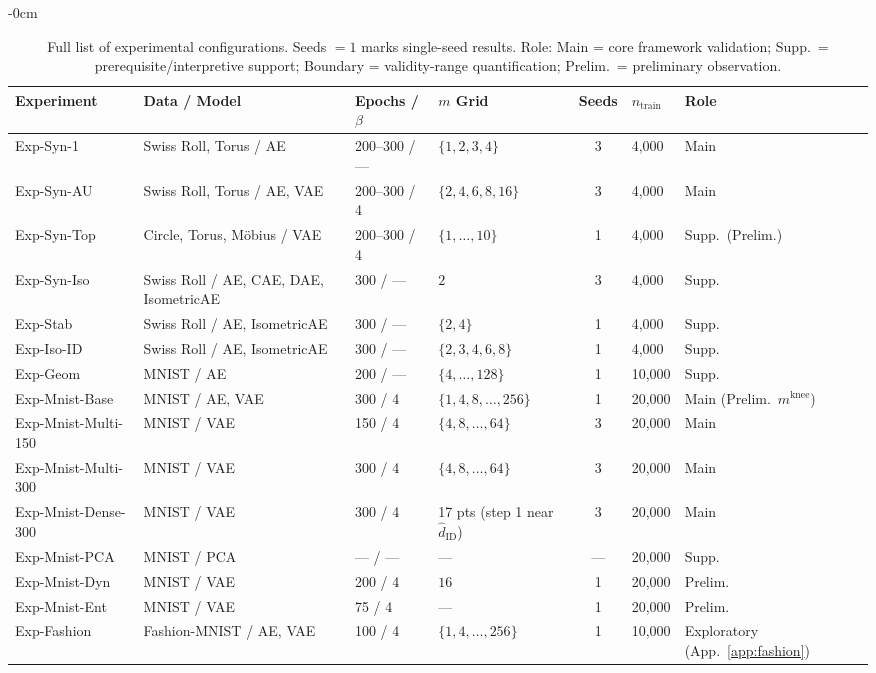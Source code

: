 \documentclass[make,article,submit,pdftex,moreauthors]{Definitions/mdpi}
\newcommand{\mknee}{m^{\mathrm{knee}}}
\begin{document}
\begin{table}[H]
\begin{adjustwidth}{-\extralength}{0cm}
\centering
\caption{Full list of experimental configurations. Seeds $=1$ marks single-seed results. Role: Main = core framework validation; Supp.\ = prerequisite/interpretive support; Boundary = validity-range quantification; Prelim.\ = preliminary observation.}
\label{tab:exp_full}
\footnotesize
\begin{tabular}{p{3.2cm}p{3.3cm}p{2.4cm}p{3.0cm}cp{1.2cm}p{1.8cm}}
\toprule
Experiment & Data / Model & Epochs / $\beta$ & $m$ Grid & Seeds & $n_\mathrm{train}$ & Role \\
\midrule
Exp-Syn-1 & Swiss Roll, Torus / AE & 200--300 / --- & $\{1,2,3,4\}$ & 3 & 4,000 & Main \\
Exp-Syn-AU & Swiss Roll, Torus / AE, VAE & 200--300 / 4 & $\{2,4,6,8,16\}$ & 3 & 4,000 & Main \\
Exp-Syn-Top & Circle, Torus, M\"obius / VAE & 200--300 / 4 & $\{1,\ldots,10\}$ & 1 & 4,000 & Supp.\ (Prelim.) \\
Exp-Syn-Iso & Swiss Roll / AE, CAE, DAE, IsometricAE & 300 / --- & $2$ & 3 & 4,000 & Supp. \\
Exp-Stab & Swiss Roll / AE, IsometricAE & 300 / --- & $\{2,4\}$ & 1 & 4,000 & Supp. \\
Exp-Iso-ID & Swiss Roll / AE, IsometricAE & 300 / --- & $\{2,3,4,6,8\}$ & 1 & 4,000 & Supp. \\
Exp-Geom & MNIST / AE & 200 / --- & $\{4,\ldots,128\}$ & 1 & 10,000 & Supp. \\
Exp-Mnist-Base & MNIST / AE, VAE & 300 / 4 & $\{1,4,8,\ldots,256\}$ & 1 & 20,000 & Main (Prelim.\ $\mknee$) \\
Exp-Mnist-Multi-150 & MNIST / VAE & 150 / 4 & $\{4,8,\ldots,64\}$ & 3 & 20,000 & Main \\
Exp-Mnist-Multi-300 & MNIST / VAE & 300 / 4 & $\{4,8,\ldots,64\}$ & 3 & 20,000 & Main \\
Exp-Mnist-Dense-300 & MNIST / VAE & 300 / 4 & 17 pts (step 1 near $\hat{d}_\mathrm{ID}$) & 3 & 20,000 & Main \\
Exp-Mnist-PCA & MNIST / PCA & --- / --- & --- & --- & 20,000 & Supp. \\
Exp-Mnist-Dyn & MNIST / VAE & 200 / 4 & $16$ & 1 & 20,000 & Prelim. \\
Exp-Mnist-Ent & MNIST / VAE & 75 / 4 & --- & 1 & 20,000 & Prelim. \\
Exp-Fashion & Fashion-MNIST / AE, VAE & 100 / 4 & $\{1,4,\ldots,256\}$ & 1 & 10,000 & Exploratory (App.~\ref{app:fashion}) \\

\end{tabular}
\end{adjustwidth}
\end{table}
\end{document}
